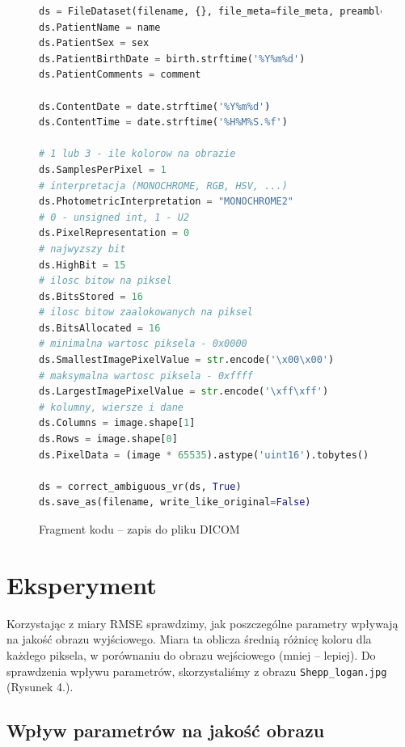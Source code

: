 \documentclass[polish,polish,a4paper]{article}
\begin{document}
			\begin{figure}[!h]
				\centering
				\begin{lstlisting}[language=Python, frame=single]
ds = FileDataset(filename, {}, file_meta=file_meta, preamble=b"\0" * 128)
ds.PatientName = name
ds.PatientSex = sex
ds.PatientBirthDate = birth.strftime('%Y%m%d')
ds.PatientComments = comment

ds.ContentDate = date.strftime('%Y%m%d')
ds.ContentTime = date.strftime('%H%M%S.%f')

# 1 lub 3 - ile kolorow na obrazie
ds.SamplesPerPixel = 1
# interpretacja (MONOCHROME, RGB, HSV, ...)
ds.PhotometricInterpretation = "MONOCHROME2"
# 0 - unsigned int, 1 - U2
ds.PixelRepresentation = 0
# najwyzszy bit
ds.HighBit = 15
# ilosc bitow na piksel
ds.BitsStored = 16
# ilosc bitow zaalokowanych na piksel
ds.BitsAllocated = 16
# minimalna wartosc piksela - 0x0000
ds.SmallestImagePixelValue = str.encode('\x00\x00')
# maksymalna wartosc piksela - 0xffff
ds.LargestImagePixelValue = str.encode('\xff\xff')
# kolumny, wiersze i dane
ds.Columns = image.shape[1]
ds.Rows = image.shape[0]
ds.PixelData = (image * 65535).astype('uint16').tobytes()

ds = correct_ambiguous_vr(ds, True)
ds.save_as(filename, write_like_original=False)
				\end{lstlisting}
				\caption{Fragment kodu -- zapis do pliku DICOM}
				\label{dicomsave}
			\end{figure}
			
	\section{Eksperyment}
		Korzystając z miary RMSE sprawdzimy, 
		jak poszczególne parametry wpływają na jakość obrazu wyjściowego. 
		Miara ta oblicza średnią różnicę koloru dla każdego piksela, w porównaniu do obrazu wejściowego (mniej -- lepiej). 
		Do sprawdzenia wpływu parametrów, skorzystaliśmy z obrazu \texttt{Shepp\_logan.jpg} (Rysunek 4.).
		
		\newpage
		\subsection{Wpływ parametrów na jakość obrazu}
		
\end{document}
